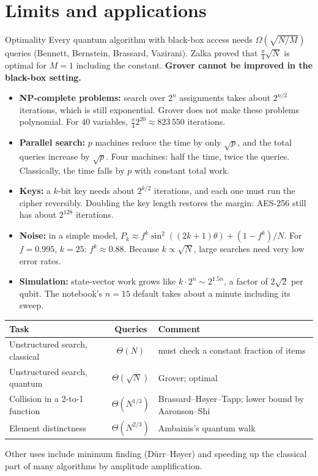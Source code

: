 \documentclass[11pt,a4paper,openany]{book}
\begin{document}
\section{Limits and applications}
\begin{keyres}{Optimality}
Every quantum algorithm with black-box access needs $\Omega(\sqrt{N/M})$ queries (Bennett, Bernstein, Brassard, Vazirani). Zalka proved that $\frac\pi4\sqrt N$ is optimal for $M = 1$ including the constant. \textbf{Grover cannot be improved in the black-box setting.}
\end{keyres}
\begin{itemize}[itemsep=2pt]
\item \textbf{NP-complete problems:} search over $2^n$ assignments takes about $2^{n/2}$ iterations, which is still exponential. Grover does not make these problems polynomial. For $40$ variables, $\frac\pi4 2^{20} \approx 823\,550$ iterations.
\item \textbf{Parallel search:} $p$ machines reduce the time by only $\sqrt p$, and the total queries increase by $\sqrt p$. Four machines: half the time, twice the queries. Classically, the time falls by $p$ with constant total work.
\item \textbf{Keys:} a $k$-bit key needs about $2^{k/2}$ iterations, and each one must run the cipher reversibly. Doubling the key length restores the margin: AES-256 still has about $2^{128}$ iterations.
\item \textbf{Noise:} in a simple model, $P_k \approx f^{k}\sin^2((2k+1)\theta) + (1 - f^k)/N$. For $f = 0.995$, $k = 25$: $f^k \approx 0.88$. Because $k \propto \sqrt N$, large searches need very low error rates.
\item \textbf{Simulation:} state-vector work grows like $k\cdot2^n \sim 2^{1.5n}$, a factor of $2\sqrt2$ per qubit. The notebook's $n = 15$ default takes about a minute including its sweep.
\end{itemize}
\begin{center}
\renewcommand{\arraystretch}{1.2}
\begin{tabularx}{\linewidth}{@{}lcX@{}}
\toprule
\textbf{Task} & \textbf{Queries} & \textbf{Comment}\\ \midrule
Unstructured search, classical & $\Theta(N)$ & must check a constant fraction of items\\
Unstructured search, quantum & $\Theta(\sqrt N)$ & Grover; optimal\\
Collision in a 2-to-1 function & $\Theta(N^{1/3})$ & Brassard--H{\o}yer--Tapp; lower bound by Aaronson--Shi\\
Element distinctness & $\Theta(N^{2/3})$ & Ambainis's quantum walk\\
\bottomrule
\end{tabularx}
\end{center}
Other uses include minimum finding (D{\"u}rr--H{\o}yer) and speeding up the classical part of many algorithms by amplitude amplification.
\end{document}
